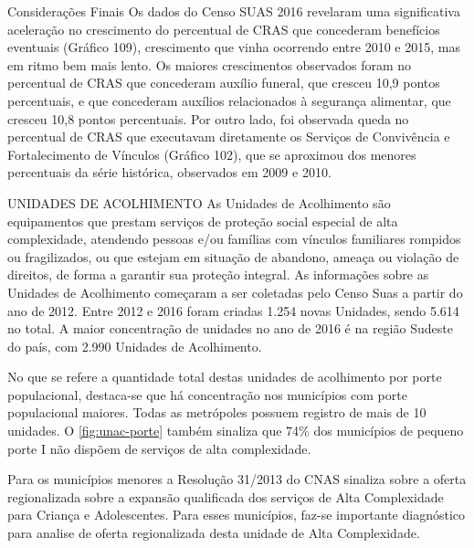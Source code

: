 \documentclass[
  brazilian]{report}
\begin{document}
Considerações Finais Os dados do Censo SUAS 2016 revelaram uma
significativa aceleração no crescimento do percentual de CRAS que
concederam benefícios eventuais (Gráfico 109), crescimento que vinha
ocorrendo entre 2010 e 2015, mas em ritmo bem mais lento. Os maiores
crescimentos observados foram no percentual de CRAS que concederam
auxílio funeral, que cresceu 10,9 pontos percentuais, e que concederam
auxílios relacionados à segurança alimentar, que cresceu 10,8 pontos
percentuais. Por outro lado, foi observada queda no percentual de CRAS
que executavam diretamente os Serviços de Convivência e Fortalecimento
de Vínculos (Gráfico 102), que se aproximou dos menores percentuais da
série histórica, observados em 2009 e 2010.

UNIDADES DE ACOLHIMENTO As Unidades de Acolhimento são equipamentos que
prestam serviços de proteção social especial de alta complexidade,
atendendo pessoas e/ou famílias com vínculos familiares rompidos ou
fragilizados, ou que estejam em situação de abandono, ameaça ou violação
de direitos, de forma a garantir sua proteção integral. As informações
sobre as Unidades de Acolhimento começaram a ser coletadas pelo Censo
Suas a partir do ano de 2012. Entre 2012 e 2016 foram criadas 1.254
novas Unidades, sendo 5.614 no total. A maior concentração de unidades
no ano de 2016 é na região Sudeste do país, com 2.990 Unidades de
Acolhimento.

No que se refere a quantidade total destas unidades de acolhimento por
porte populacional, destaca-se que há concentração nos municípios com
porte populacional maiores. Todas as metrópoles possuem registro de mais
de 10 unidades. O \cref{fig:unac-porte} também sinaliza que 74\% dos
municípios de pequeno porte I não dispõem de serviços de alta
complexidade.

Para os municípios menores a Resolução 31/2013 do CNAS sinaliza sobre a
oferta regionalizada sobre a expansão qualificada dos serviços de Alta
Complexidade para Criança e Adolescentes. Para esses municípios, faz-se
importante diagnóstico para analise de oferta regionalizada desta
unidade de Alta Complexidade.
\end{document}
